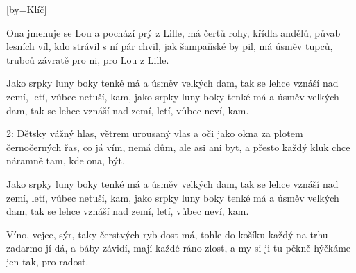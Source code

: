 [by={Klíč}]

\beginverse{}
Ona jmenuje se Lou a pochází prý z Lille,
má čertů rohy, křídla andělů, půvab lesních víl,
kdo strávil s ní pár chvil, jak šampaňské by pil,
má úsměv tupců, trubců závratě pro ni, pro Lou z Lille.
\endverse{}

\beginchorus{}
Jako srpky luny boky tenké má a úsměv velkých dam,
tak se lehce vznáší nad zemí, letí, vůbec netuší, kam,
jako srpky luny boky tenké má a úsměv velkých dam,
tak se lehce vznáší nad zemí, letí, vůbec neví, kam.
\endchorus{}

\beginverse{}
\chordsoff{}
2: Dětsky vážný hlas, větrem urousaný vlas
a oči jako okna za plotem černočerných řas,
co já vím, nemá dům, ale asi ani byt,
a přesto každý kluk chce náramně tam, kde ona, být.
\chordson{}
\endverse{}

\beginchorus{}
\chordsoff{}
Jako srpky luny boky tenké má a úsměv velkých dam,
tak se lehce vznáší nad zemí, letí, vůbec netuší, kam,
jako srpky luny boky tenké má a úsměv velkých dam,
tak se lehce vznáší nad zemí, letí, vůbec neví, kam.
\chordson{}
\endchorus{}

\beginverse{}
\chordsoff{}
Víno, vejce, sýr, taky čerstvých ryb dost má,
tohle do košíku každý na trhu zadarmo jí dá,
a báby závidí, mají každé ráno zlost,
a my si ji tu pěkně hýčkáme jen tak, pro radost.
\chordson{}
\endverse{}


